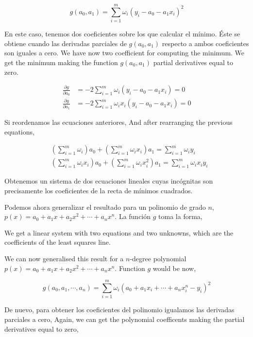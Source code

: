 \begin{equation*}
g(a_0,a_1)=\sum_{i=1}^m \omega_i\left(y_i-a_0-a_1 x_i \right)^2
\end{equation*}
\begin{paracol}{2} 
En este caso, tenemos dos coeficientes sobre los que calcular el mínimo. Éste se obtiene cuando las derivadas parciales de $g(a_0,a_1)$ respecto a ambos coeficientes son iguales a cero.
\switchcolumn
We have now two coefficient for computing the minimum. We get the minimum making the function $g(a_0,a_1)$ partial derivatives equal to zero.   
\end{paracol}
\begin{align*}
\frac{\partial g}{\partial a_0}&=-2\sum_{i=1}^m \omega_i (y_i-a_0-a_1 x_i) = 0\\
\frac{\partial g}{\partial a_1}&=-2\sum_{i=1}^m \omega_i x_i(y_i-a_0-a_1 x_i) = 0
\end{align*} 
\begin{paracol}{2}
Si reordenamos las ecuaciones anteriores,
\switchcolumn
And after rearranging the previous equations,
\end{paracol}
\begin{align*}
&\left(\sum_{i=1}^m \omega_i\right)a_0+ \left(\sum_{i=1}^m \omega_ix_i\right)a_1 =\sum_{i=1}^m \omega_iy_i\\
&\left(\sum_{i=1}^m \omega_ix_i\right)a_0+ \left(\sum_{i=1}^m \omega_ix_i^2\right)a_1 =\sum_{i=1}^m \omega_ix_iy_i
\end{align*}
\begin{paracol}{2}
Obtenemos un sistema de dos ecuaciones lineales cuyas incógnitas son precisamente los coeficientes de la recta de mínimos cuadrados.

Podemos ahora generalizar el resultado para un polinomio de grado $n$, $p(x)=a_0+a_1x+a_2x^2+\cdots +a_nx^n$. La función $g$ toma la forma,

\switchcolumn
We get a linear system with two equations and two unknowns, which are the coefficients of the least squares line.

We can now generalised this result for a $n$-degree polynomial $p(x)=a_0+a_1x+a_2x^2+\cdots +a_nx^n$. Function $g$ would be now,
\end{paracol}
\begin{equation*}
g(a_0,a_1,\cdots, a_n)=\sum_{i=1}^m \omega_i \left (a_0+a_1x_i+\cdots+ a_nx_i^n-y_i\right)^2
\end{equation*}
\begin{paracol}{2}
De nuevo, para obtener los coeficientes del polinomio igualamos las derivadas parciales a cero,
\switchcolumn
Again, we can get the polynomial coefficents making the partial derivatives equal to zero,
\end{paracol}
